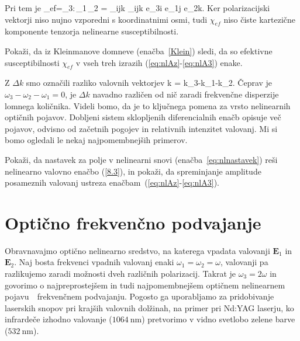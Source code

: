 Pri tem je 
\beq
\chi_{ef}=_{3}\cdot\chi:\,_{1}\,_{2} = 
\sum_{ijk} \chi_{ijk} e_{3i} e_{1j} e_{2k}.
\label{eq:chicomp}
\eeq
Ker polarizacijski vektorji niso nujno vzporedni s koordinatnimi osmi, tudi $\chi_{ef}$ 
niso čiste kartezične komponente tenzorja nelinearne susceptibilnosti.
\begin{definition}
Pokaži, da iz Kleinmanove domneve (enačba~\ref{Klein}) sledi, da so 
efektivne susceptibilnosti $\chi_{ef}$ v vseh treh izrazih (\ref{eq:nlAz}-\ref{eq:nlA3}) enake.
\end{definition}

Z $\Delta k$ smo označili razliko valovnih vektorjev
\beq
\Delta k = k_{3}-k_{1}-k_{2}.
\eeq
Čeprav je $\omega_{3}-\omega_{2}-\omega_{1}=0$, je $\Delta k$ navadno različen od nič zaradi 
frekvenčne disperzije lomnega količnika. Videli bomo, da je to ključnega pomena 
za vrsto nelinearnih optičnih pojavov. Dobljeni sistem sklopljenih diferencialnih enačb opisuje več pojavov, 
odvisno od začetnih pogojev in relativnih intenzitet valovanj. Mi si bomo ogledali le nekaj
najpomembnejših primerov.
\begin{definition}
Pokaži, da nastavek za polje v nelinearni snovi (enačba~\ref{eq:nlnastavek}) reši nelinearno
valovno enačbo (\ref{8.3}), in pokaži, da spreminjanje amplitude posameznih valovanj 
ustreza enačbam~(\ref{eq:nlAz}-\ref{eq:nlA3}).
\end{definition}

\section{Optično frekvenčno podvajanje}

Obravnavajmo optično nelinearno sredstvo, na katerega vpadata valovanji ${\mathbf E}_1$ in
$\mathbf{E}_2$.
Naj bosta frekvenci vpadnih valovanj enaki $\omega_{1}=\omega_{2}=\omega$, valovanji
pa razlikujemo zaradi možnosti dveh različnih polarizacij. Takrat je $\omega_{3}=2\omega$
in govorimo o najpreprostejšem in tudi najpomembnejšem optičnem nelinearnem 
pojavu~\textendash~frekvenčnem podvajanju. 
Pogosto ga uporabljamo za pridobivanje laserskih snopov pri krajših valovnih dolžinah, na primer
pri Nd:YAG laserju, ko infrardeče izhodno valovanje ($1064~\si{\nano\metre}$) 
pretvorimo v vidno svetlobo zelene barve ($532~\si{\nano\metre}$). 

